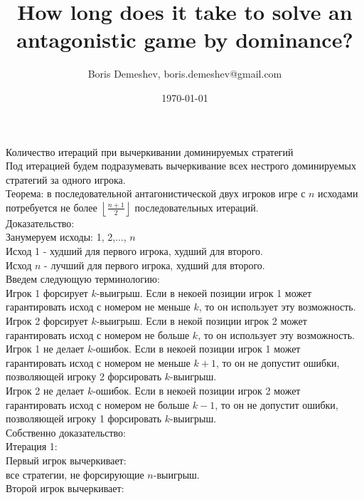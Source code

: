 \documentclass[pdftex,12pt,a4paper]{article}
\title{How long does it take to solve an antagonistic game by dominance?}
\author{Boris Demeshev, boris.demeshev@gmail.com}
\date{\today}
\begin{document}
\maketitle






Количество итераций при вычеркивании доминируемых стратегий \\

Под итерацией будем подразумевать вычеркивание всех нестрого доминируемых стратегий за одного игрока. \\

Теорема: в последовательной антагонистической двух игроков игре с $n$ исходами потребуется не более $\left\lfloor \frac{n+1}{2}\right\rfloor$ последовательных итераций. \\
Доказательство: \\
Занумеруем исходы: 1, 2,..., $n$ \\
Исход 1 - худший для первого игрока, худший для второго. \\
Исход $n$ - лучший для первого игрока, худший для второго. \\
Введем следующую терминологию: \\
Игрок 1 форсирует $k$-выигрыш. Если в некоей позиции игрок 1 может гарантировать исход с номером не меньше $k$, то он использует эту возможность. \\
Игрок 2 форсирует $k$-выигрыш. Если в некой позиции игрок 2 может гарантировать исход с номером не больше $k$, то он использует эту возможность. \\
Игрок 1 не делает $k$-ошибок. Если в некоей позиции игрок 1 может гарантировать исход с номером не меньше $k+1$, то он не допустит ошибки, позволяющей игроку 2 форсировать $k$-выигрыш. \\
Игрок 2 не делает $k$-ошибок. Если в некоей позиции игрок 2 может гарантировать исход с номером не больше $k-1$, то он не допустит ошибки, позволяющей игроку 1 форсировать $k$-выигрыш. \\
Собственно доказательство: \\
Итерация 1: \\
Первый игрок вычеркивает: \\
все стратегии, не форсирующие $n$-выигрыш. \\
Второй игрок вычеркивает: \\ 
\end{document}
